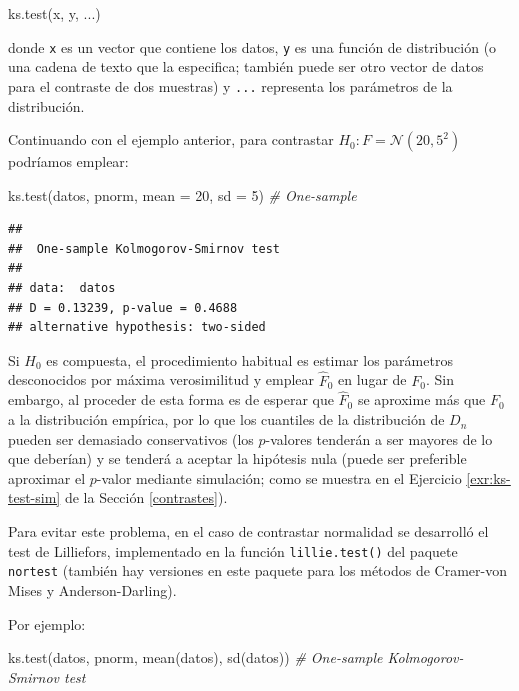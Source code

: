 \documentclass[
]{book}
\newenvironment{Shaded}{\begin{snugshade}}{\end{snugshade}}
\newcommand{\AttributeTok}[1]{\textcolor[rgb]{0.77,0.63,0.00}{#1}}
\newcommand{\CommentTok}[1]{\textcolor[rgb]{0.56,0.35,0.01}{\textit{#1}}}
\newcommand{\DecValTok}[1]{\textcolor[rgb]{0.00,0.00,0.81}{#1}}
\newcommand{\FunctionTok}[1]{\textcolor[rgb]{0.00,0.00,0.00}{#1}}
\newcommand{\NormalTok}[1]{#1}
\theoremstyle{break}
\theoremstyle{nonumberplain}
\begin{document}
\begin{Shaded}
\begin{Highlighting}[]
\FunctionTok{ks.test}\NormalTok{(x, y, ...)}
\end{Highlighting}
\end{Shaded}

donde \texttt{x} es un vector que contiene los datos, \texttt{y} es una función de distribución
(o una cadena de texto que la especifica; también puede ser otro vector de datos
para el contraste de dos muestras) y \texttt{...} representa los parámetros de la distribución.

Continuando con el ejemplo anterior, para contrastar \(H_0:F= \mathcal{N}(20,5^2)\) podríamos emplear:

\begin{Shaded}
\begin{Highlighting}[]
\FunctionTok{ks.test}\NormalTok{(datos, pnorm, }\AttributeTok{mean =} \DecValTok{20}\NormalTok{, }\AttributeTok{sd =} \DecValTok{5}\NormalTok{) }\CommentTok{\# One{-}sample }
\end{Highlighting}
\end{Shaded}

\begin{verbatim}
## 
##  One-sample Kolmogorov-Smirnov test
## 
## data:  datos
## D = 0.13239, p-value = 0.4688
## alternative hypothesis: two-sided
\end{verbatim}

Si \(H_0\) es compuesta, el procedimiento habitual es estimar los parámetros desconocidos
por máxima verosimilitud y emplear \(\hat{F}_0\) en lugar de \(F_0\).
Sin embargo, al proceder de esta forma es de esperar que \(\hat{F}_0\) se aproxime más
que \(F_0\) a la distribución empírica, por lo que los cuantiles de la distribución de
\(D_n\) pueden ser demasiado conservativos (los \(p\)-valores tenderán a ser mayores de
lo que deberían) y se tenderá a aceptar la hipótesis nula (puede ser preferible aproximar el \(p\)-valor mediante simulación; como se muestra en el Ejercicio \ref{exr:ks-test-sim} de la Sección \ref{contrastes}).

Para evitar este problema, en el caso de contrastar normalidad se desarrolló el test
de Lilliefors, implementado en la función \texttt{lillie.test()} del paquete \texttt{nortest}
(también hay versiones en este paquete para los métodos de Cramer-von Mises y
Anderson-Darling).

Por ejemplo:

\begin{Shaded}
\begin{Highlighting}[]
\FunctionTok{ks.test}\NormalTok{(datos, pnorm, }\FunctionTok{mean}\NormalTok{(datos), }\FunctionTok{sd}\NormalTok{(datos)) }\CommentTok{\# One{-}sample Kolmogorov{-}Smirnov test}
\end{Highlighting}
\end{Shaded}
\end{document}

